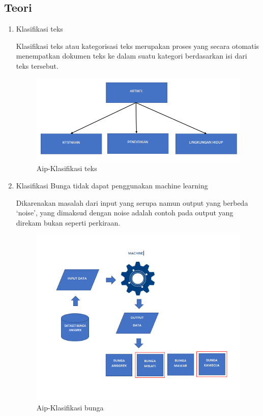 \subsection{Teori}
\begin{enumerate}
\item Klasifikasi teks
	\par Klasifikasi teks atau kategorisasi teks merupakan proses yang secara otomatis menempatkan dokumen teks ke dalam suatu kategori berdasarkan isi dari teks tersebut. 
	\begin{figure}[ht]
		\centering
		\includegraphics[scale=0.5]{figures/AIP/b1.PNG}
		\caption{Aip-Klasifikasi teks}
		\label{contoh}
	\end{figure}
	
\item Klasifikasi Bunga tidak dapat penggunakan machine learning
	\par Dikarenakan masalah dari input yang serupa namun output yang berbeda ‘noise’, yang dimaksud dengan noise adalah contoh pada output yang direkam bukan seperti perkiraan.
	\begin{figure}[ht]
		\centering
		\includegraphics[scale=0.5]{figures/AIP/b2.PNG}
		\caption{Aip-Klasifikasi bunga}
		\label{contoh}
	\end{figure}


\end{enumerate}
